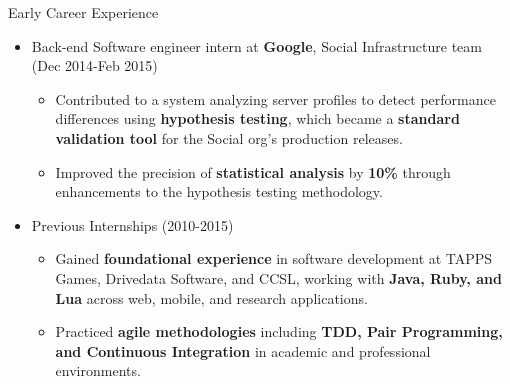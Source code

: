 
\normalsize{Early Career Experience}
\begin{itemize}
    \item \footnotesize{Back-end Software engineer intern at \textbf{Google}, Social Infrastructure team (Dec 2014-Feb 2015)}
    \begin{itemize}
        \item \scriptsize{Contributed to a system analyzing server profiles to detect performance differences using \textbf{hypothesis testing}, which became a \textbf{standard validation tool} for the Social org's production releases.}
        \item \scriptsize{Improved the precision of \textbf{statistical analysis} by \textbf{10\%} through enhancements to the hypothesis testing methodology.}
    \end{itemize}

    \item \footnotesize{Previous Internships (2010-2015)}
    \begin{itemize}
        \item \scriptsize{Gained \textbf{foundational experience} in software development at TAPPS Games, Drivedata Software, and CCSL, working with \textbf{Java, Ruby, and Lua} across web, mobile, and research applications.}
        \item \scriptsize{Practiced \textbf{agile methodologies} including \textbf{TDD, Pair Programming, and Continuous Integration} in academic and professional environments.}
    \end{itemize}
\end{itemize}